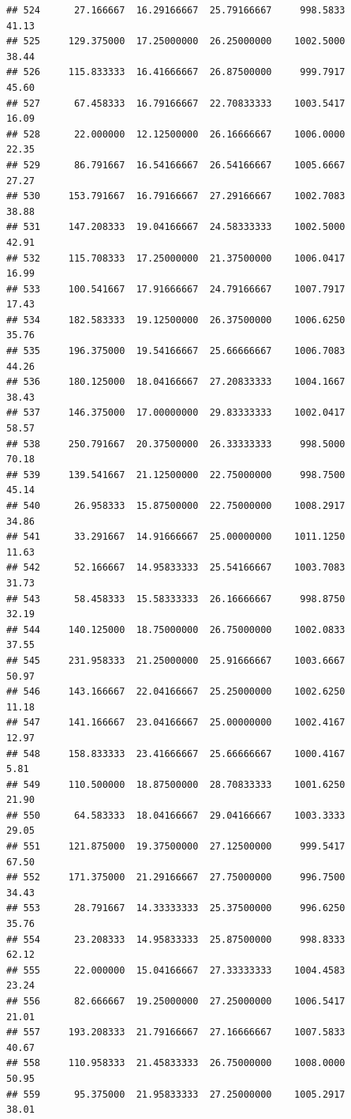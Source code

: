 \documentclass[
]{article}
\begin{document}
\begin{verbatim}
## 524      27.166667  16.29166667  25.79166667     998.5833       41.13
## 525     129.375000  17.25000000  26.25000000    1002.5000       38.44
## 526     115.833333  16.41666667  26.87500000     999.7917       45.60
## 527      67.458333  16.79166667  22.70833333    1003.5417       16.09
## 528      22.000000  12.12500000  26.16666667    1006.0000       22.35
## 529      86.791667  16.54166667  26.54166667    1005.6667       27.27
## 530     153.791667  16.79166667  27.29166667    1002.7083       38.88
## 531     147.208333  19.04166667  24.58333333    1002.5000       42.91
## 532     115.708333  17.25000000  21.37500000    1006.0417       16.99
## 533     100.541667  17.91666667  24.79166667    1007.7917       17.43
## 534     182.583333  19.12500000  26.37500000    1006.6250       35.76
## 535     196.375000  19.54166667  25.66666667    1006.7083       44.26
## 536     180.125000  18.04166667  27.20833333    1004.1667       38.43
## 537     146.375000  17.00000000  29.83333333    1002.0417       58.57
## 538     250.791667  20.37500000  26.33333333     998.5000       70.18
## 539     139.541667  21.12500000  22.75000000     998.7500       45.14
## 540      26.958333  15.87500000  22.75000000    1008.2917       34.86
## 541      33.291667  14.91666667  25.00000000    1011.1250       11.63
## 542      52.166667  14.95833333  25.54166667    1003.7083       31.73
## 543      58.458333  15.58333333  26.16666667     998.8750       32.19
## 544     140.125000  18.75000000  26.75000000    1002.0833       37.55
## 545     231.958333  21.25000000  25.91666667    1003.6667       50.97
## 546     143.166667  22.04166667  25.25000000    1002.6250       11.18
## 547     141.166667  23.04166667  25.00000000    1002.4167       12.97
## 548     158.833333  23.41666667  25.66666667    1000.4167        5.81
## 549     110.500000  18.87500000  28.70833333    1001.6250       21.90
## 550      64.583333  18.04166667  29.04166667    1003.3333       29.05
## 551     121.875000  19.37500000  27.12500000     999.5417       67.50
## 552     171.375000  21.29166667  27.75000000     996.7500       34.43
## 553      28.791667  14.33333333  25.37500000     996.6250       35.76
## 554      23.208333  14.95833333  25.87500000     998.8333       62.12
## 555      22.000000  15.04166667  27.33333333    1004.4583       23.24
## 556      82.666667  19.25000000  27.25000000    1006.5417       21.01
## 557     193.208333  21.79166667  27.16666667    1007.5833       40.67
## 558     110.958333  21.45833333  26.75000000    1008.0000       50.95
## 559      95.375000  21.95833333  27.25000000    1005.2917       38.01

\end{verbatim}
\end{document}
